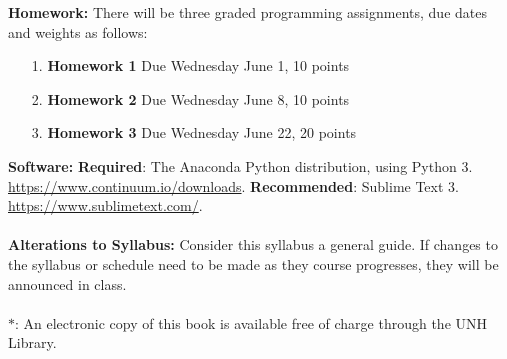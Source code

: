 \documentclass{article}
\begin{document}
\noindent\textbf{Homework:} There will be three graded programming assignments, due dates and weights as follows: \\
\begin{itemize}
	\item[1.] \textbf{Homework 1} Due Wednesday June 1, 10 points \\
	\item[2.] \textbf{Homework 2} Due Wednesday June 8, 10 points \\
	\item[3.] \textbf{Homework 3} Due Wednesday June 22, 20 points \\
\end{itemize}

\noindent\textbf{Software:} \textbf{Required}: The Anaconda Python distribution, using Python 3. \textcolor{blue}{\url{https://www.continuum.io/downloads}}. \textbf{Recommended}: Sublime Text 3. \textcolor{blue}{\url{https://www.sublimetext.com/}}. \\
\\
\noindent\textbf{Alterations to Syllabus:} Consider this syllabus a general guide. If changes to the syllabus or schedule need to be made as they course progresses, they will be announced in class. \\
\\
$*$: An electronic copy of this book is available free of charge through the UNH Library.
\end{document}
